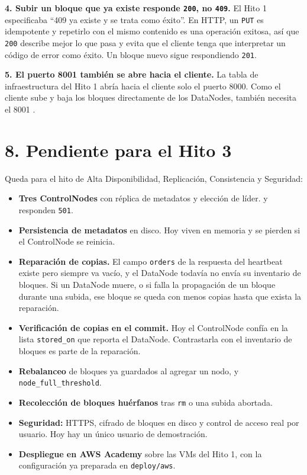 \documentclass[10pt]{article}
\begin{document}
\textbf{4. Subir un bloque que ya existe responde \texttt{200}, no \texttt{409}.} El Hito 1 especificaba ``409 ya existe y se trata como éxito''. En HTTP, un \texttt{PUT} es idempotente y repetirlo con el mismo contenido es una operación exitosa, así que \texttt{200} describe mejor lo que pasa y evita que el cliente tenga que interpretar un código de error como éxito. Un bloque nuevo sigue respondiendo \texttt{201}.

\textbf{5. El puerto 8001 también se abre hacia el cliente.} La tabla de infraestructura del Hito 1 abría hacia el cliente solo el puerto 8000. Como el cliente sube y baja los bloques directamente de los DataNodes, también necesita el 8001 .

\separador

\section{8. Pendiente para el Hito 3}

Queda para el hito de Alta Disponibilidad, Replicación, Consistencia y Seguridad:

\begin{itemize}
\item \textbf{Tres ControlNodes} con réplica de metadatos y elección de líder.  y  responden \texttt{501}.
\item \textbf{Persistencia de metadatos} en disco. Hoy viven en memoria y se pierden si el ControlNode se reinicia.
\item \textbf{Reparación de copias.} El campo \texttt{orders} de la respuesta del heartbeat existe pero siempre va vacío, y el DataNode todavía no envía su inventario de bloques. Si un DataNode muere, o si falla la propagación de un bloque durante una subida, ese bloque se queda con menos copias hasta que exista la reparación.
\item \textbf{Verificación de copias en el commit.} Hoy el ControlNode confía en la lista \texttt{stored\_on} que reporta el DataNode. Contrastarla con el inventario de bloques es parte de la reparación.
\item \textbf{Rebalanceo} de bloques ya guardados al agregar un nodo, y \texttt{node\_full\_threshold}.
\item \textbf{Recolección de bloques huérfanos} tras \texttt{rm} o una subida abortada.
\item \textbf{Seguridad:} HTTPS, cifrado de bloques en disco y control de acceso real por usuario. Hoy hay un único usuario de demostración.
\item \textbf{Despliegue en AWS Academy} sobre las VMs del Hito 1, con la configuración ya preparada en \texttt{deploy/aws}.
\end{itemize}
\end{document}
